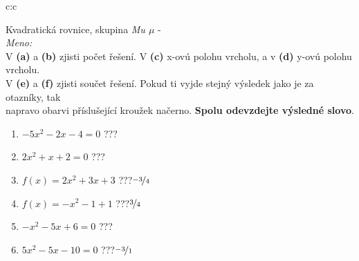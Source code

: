 \documentclass[10pt]{report}
\begin{document}
\clearpage
\thispagestyle{empty}
\begin{tabular}{c:c}
\begin{minipage}[c][99mm][t]{0.49\linewidth}
\begin{center}
\vspace{7mm}
{\huge Kvadratická rovnice, skupina \textit{Mu $\mu$} -}\\[4.5mm]
\textit{Meno:}\phantom{xxxxxxxxxxxxxxxxxxxxxxxxxxxxxxxxxxxxxxxxxxxxxxxxxxxxxxxxxxxxxxxxx}\\[3.5mm]
V \textbf{(a)} a \textbf{(b)} zjisti počet řešení. V \textbf{(c)} x-ovú polohu vrcholu, a v \textbf{(d)} y-ovú polohu vrcholu.\\V \textbf{(e)} a \textbf{(f)} zjisti součet řešení. Pokud ti vyjde stejný výsledek jako je za otazníky, tak\\napravo obarvi příslušející kroužek načerno. \textbf{Spolu odevzdejte výsledné slovo}.\\[3mm]
\begin{minipage}{0.77\linewidth}
\begin{center}
\begin{varwidth}{\textwidth}
\begin{enumerate}
\large
\item $-5x^2-2x-4=0$\quad \dotfill\; ???\;\dotfill {}
\item $2x^2+x+2=0$\quad \dotfill\; ???\;\dotfill {}
\item $f(x)=2x^2+3x+3$\quad \dotfill\; ???\;\dotfill \quad $\nicefrac{-3}{4}$
\item $f(x)=-x^2-1+1$\quad \dotfill\; ???\;\dotfill \quad $\nicefrac{3}{4}$
\item $-x^2-5x+6=0$\quad \dotfill\; ???\;\dotfill {}
\item $5x^2-5x-10=0$\quad \dotfill\; ???\;\dotfill \quad $\nicefrac{-3}{1}$
\end{enumerate}
\end{varwidth}
\end{center}
\end{minipage}

\end{center}
\end{minipage}
\end{tabular}
\end{document}
